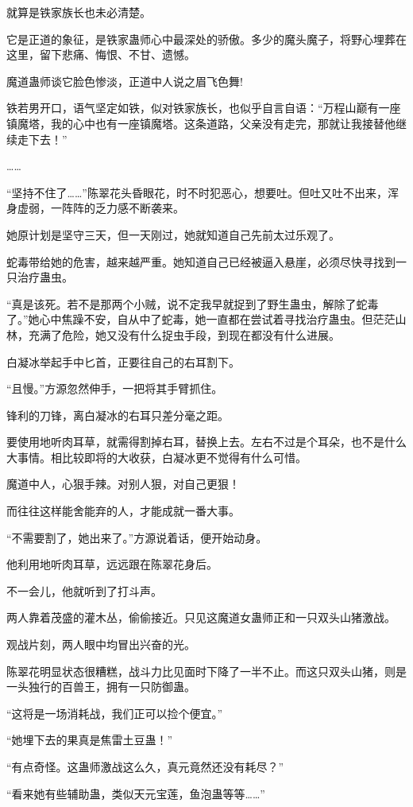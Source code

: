 \begin{this_body}
就算是铁家族长也未必清楚。

它是正道的象征，是铁家蛊师心中最深处的骄傲。多少的魔头魔子，将野心埋葬在这里，留下悲痛、悔恨、不甘、遗憾。

魔道蛊师谈它脸色惨淡，正道中人说之眉飞色舞!

铁若男开口，语气坚定如铁，似对铁家族长，也似乎自言自语：“万程山巅有一座镇魔塔，我的心中也有一座镇魔塔。这条道路，父亲没有走完，那就让我接替他继续走下去！”

……

“坚持不住了……”陈翠花头昏眼花，时不时犯恶心，想要吐。但吐又吐不出来，浑身虚弱，一阵阵的乏力感不断袭来。

她原计划是坚守三天，但一天刚过，她就知道自己先前太过乐观了。

蛇毒带给她的危害，越来越严重。她知道自己已经被逼入悬崖，必须尽快寻找到一只治疗蛊虫。

“真是该死。若不是那两个小贼，说不定我早就捉到了野生蛊虫，解除了蛇毒了。”她心中焦躁不安，自从中了蛇毒，她一直都在尝试着寻找治疗蛊虫。但茫茫山林，充满了危险，她又没有什么捉虫手段，到现在都没有什么进展。

白凝冰举起手中匕首，正要往自己的右耳割下。

“且慢。”方源忽然伸手，一把将其手臂抓住。

锋利的刀锋，离白凝冰的右耳只差分毫之距。

要使用地听肉耳草，就需得割掉右耳，替换上去。左右不过是个耳朵，也不是什么大事情。相比较即将的大收获，白凝冰更不觉得有什么可惜。

魔道中人，心狠手辣。对别人狠，对自己更狠！

而往往这样能舍能弃的人，才能成就一番大事。

“不需要割了，她出来了。”方源说着话，便开始动身。

他利用地听肉耳草，远远跟在陈翠花身后。

不一会儿，他就听到了打斗声。

两人靠着茂盛的灌木丛，偷偷接近。只见这魔道女蛊师正和一只双头山猪激战。

观战片刻，两人眼中均冒出兴奋的光。

陈翠花明显状态很糟糕，战斗力比见面时下降了一半不止。而这只双头山猪，则是一头独行的百兽王，拥有一只防御蛊。

“这将是一场消耗战，我们正可以捡个便宜。”

“她埋下去的果真是焦雷土豆蛊！”

“有点奇怪。这蛊师激战这么久，真元竟然还没有耗尽？”

“看来她有些辅助蛊，类似天元宝莲，鱼泡蛊等等……”


\end{this_body}
